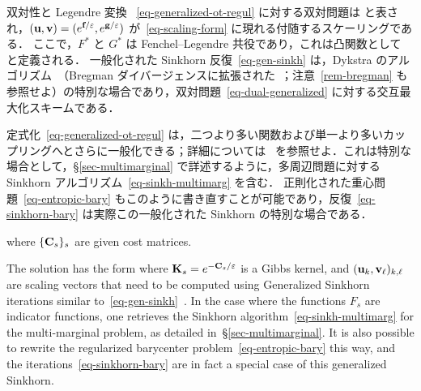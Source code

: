 \begin{rem1}{双対性と Legendre 変換}
~\eqref{eq-generalized-ot-regul} に対する双対問題は
と表され，$(\mathrm{\textbf{u}},\mathrm{\textbf{v}}) = (e^{\mathrm{\textbf{f}}/\varepsilon},e^{\mathrm{\textbf{g}}/\varepsilon})$ が~\eqref{eq-scaling-form} に現れる付随するスケーリングである．
ここで，$F^*$ と $G^*$ は Fenchel--Legendre 共役であり，これは凸関数として
と定義される．
%
一般化された Sinkhorn 反復~\eqref{eq-gen-sinkh} は，Dykstra のアルゴリズム~\citep{Dykstra83,Dykstra85}（Bregman ダイバージェンスに拡張された~\citep{bauschke-lewis,CensorReich-Dykstra}；注意~\ref{rem-bregman} も参照せよ）の特別な場合であり，双対問題~\eqref{eq-dual-generalized} に対する交互最大化スキームである．
\end{rem1}

定式化~\eqref{eq-generalized-ot-regul} は，二つより多い関数および単一より多いカップリングへとさらに一般化できる；詳細については~\citep{2016-chizat-sinkhorn} を参照せよ．これは特別な場合として，\S\ref{sec-multimarginal} で詳述するように，多周辺問題に対する Sinkhorn アルゴリズム~\eqref{eq-sinkh-multimarg} を含む．
%
正則化された重心問題~\eqref{eq-entropic-bary} もこのように書き直すことが可能であり，反復~\eqref{eq-sinkhorn-bary} は実際この一般化された Sinkhorn の特別な場合である．


where $\{\mathrm{\textbf{C}}_s\}_s$ are given cost matrices.

The solution has the form
where $\mathrm{\textbf{K}}_s=e^{-\mathrm{\textbf{C}}_s/\varepsilon}$ is a Gibbs kernel, and $(\mathrm{\textbf{u}}_k,\mathrm{\textbf{v}}_\ell)_{k,\ell}$ are scaling vectors that need to be computed using Generalized Sinkhorn iterations similar to~\eqref{eq-gen-sinkh}~\citep{2016-chizat-sinkhorn}.
%
In the case where the functions $F_s$ are indicator functions, one retrieves the Sinkhorn algorithm~\eqref{eq-sinkh-multimarg} for the multi-marginal problem, as detailed in~\S\ref{sec-multimarginal}.
%
It is also possible to rewrite the regularized barycenter problem~\eqref{eq-entropic-bary} this way, and the iterations~\eqref{eq-sinkhorn-bary} are in fact a special case of this generalized Sinkhorn.

\fi %


